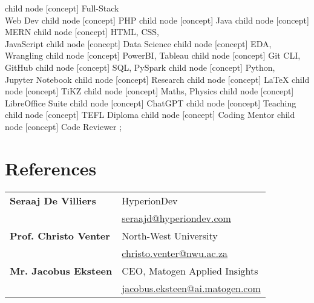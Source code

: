 \documentclass[a4paper,10pt]{article}
\begin{document}
	\begin{center}
		\tikz[mindmap, text=white, grow cyclic,
		root concept/.style={concept color=red!20, font=\Huge\bfseries},
		level 1 concept/.append style={
			sibling angle=100, %
			level distance=6.5cm,
			every child/.style={concept color=blue!20, font=\large\bfseries}
		},
		level 2 concept/.append style={
			sibling angle=50,
			level distance=3.5cm,
			every child/.style={concept color=red!20, text=black}
		}]
		child {node [concept] {Full-Stack \\ Web Dev}
			child {node [concept] {PHP}}
			child {node [concept] {Java}}
			child {node [concept] {MERN}}
			child {node [concept] {HTML, CSS, \\ JavaScript}}
		}
		child {node [concept] {Data Science}
			child {node [concept] {EDA, Wrangling}}
			child {node [concept] {PowerBI, Tableau}}
			child {node [concept] {Git CLI, GitHub}}
			child {node [concept] {SQL, PySpark}}
			child {node [concept] {Python, \\ Jupyter Notebook}}
		}
		child {node [concept] {Research}
			child {node [concept] {\LaTeX}}
			child {node [concept] {TiKZ}}
			child {node [concept] {Maths, Physics}}
			child {node [concept] {LibreOffice Suite}}
			child {node [concept] {ChatGPT}}
		}
		child {node [concept] {Teaching}
			child {node [concept] {TEFL Diploma}}
			child {node [concept] {Coding Mentor}}
			child {node [concept] {Code Reviewer}}
		};
	\end{center}
	
	\section*{References}
	\begin{tabularx}{\textwidth}{l X}
		\textbf{Seraaj De Villiers} & HyperionDev \\
		& \faEnvelope \quad \href{mailto:seraajd@hyperiondev.com}{seraajd@hyperiondev.com} \\[0.2cm]
		
		\textbf{Prof. Christo Venter} & North-West University \\
		& \faEnvelope \quad \href{mailto:christo.venter@nwu.ac.za}{christo.venter@nwu.ac.za} \\[0.2cm]
		
		\textbf{Mr. Jacobus Eksteen} & CEO, Matogen Applied Insights \\
		& \faEnvelope \quad \href{mailto:jacobus.eksteen@ai.matogen.com}{jacobus.eksteen@ai.matogen.com} \\
	\end{tabularx}
	
\end{document}
